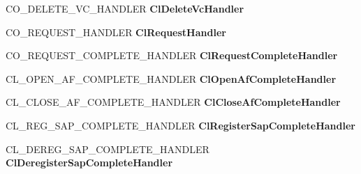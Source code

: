 \begin{DoxyCompactItemize}
C\+O\+\_\+\+D\+E\+L\+E\+T\+E\+\_\+\+V\+C\+\_\+\+H\+A\+N\+D\+L\+ER {\bfseries Cl\+Delete\+Vc\+Handler}
\item 
\mbox{\label{struct___n_d_i_s___c_l_i_e_n_t___c_h_a_r_a_c_t_e_r_i_s_t_i_c_s_aff4246766d4675b8973f46edd56f3506}} 
C\+O\+\_\+\+R\+E\+Q\+U\+E\+S\+T\+\_\+\+H\+A\+N\+D\+L\+ER {\bfseries Cl\+Request\+Handler}
\item 
\mbox{\label{struct___n_d_i_s___c_l_i_e_n_t___c_h_a_r_a_c_t_e_r_i_s_t_i_c_s_a5739dec27e8dec094e7c5deb04f098b0}} 
C\+O\+\_\+\+R\+E\+Q\+U\+E\+S\+T\+\_\+\+C\+O\+M\+P\+L\+E\+T\+E\+\_\+\+H\+A\+N\+D\+L\+ER {\bfseries Cl\+Request\+Complete\+Handler}
\item 
\mbox{\label{struct___n_d_i_s___c_l_i_e_n_t___c_h_a_r_a_c_t_e_r_i_s_t_i_c_s_aa8e406bfe60f8ee8dbfc215ecd3a59db}} 
C\+L\+\_\+\+O\+P\+E\+N\+\_\+\+A\+F\+\_\+\+C\+O\+M\+P\+L\+E\+T\+E\+\_\+\+H\+A\+N\+D\+L\+ER {\bfseries Cl\+Open\+Af\+Complete\+Handler}
\item 
\mbox{\label{struct___n_d_i_s___c_l_i_e_n_t___c_h_a_r_a_c_t_e_r_i_s_t_i_c_s_a4a645ab78f1e0529c9b1ab420d7c0b6b}} 
C\+L\+\_\+\+C\+L\+O\+S\+E\+\_\+\+A\+F\+\_\+\+C\+O\+M\+P\+L\+E\+T\+E\+\_\+\+H\+A\+N\+D\+L\+ER {\bfseries Cl\+Close\+Af\+Complete\+Handler}
\item 
\mbox{\label{struct___n_d_i_s___c_l_i_e_n_t___c_h_a_r_a_c_t_e_r_i_s_t_i_c_s_a2b7c9b69725a36a32bcc1b5789762402}} 
C\+L\+\_\+\+R\+E\+G\+\_\+\+S\+A\+P\+\_\+\+C\+O\+M\+P\+L\+E\+T\+E\+\_\+\+H\+A\+N\+D\+L\+ER {\bfseries Cl\+Register\+Sap\+Complete\+Handler}
\item 
\mbox{\label{struct___n_d_i_s___c_l_i_e_n_t___c_h_a_r_a_c_t_e_r_i_s_t_i_c_s_abfb7e090bb03cbc386df1697ae56cfe5}} 
C\+L\+\_\+\+D\+E\+R\+E\+G\+\_\+\+S\+A\+P\+\_\+\+C\+O\+M\+P\+L\+E\+T\+E\+\_\+\+H\+A\+N\+D\+L\+ER {\bfseries Cl\+Deregister\+Sap\+Complete\+Handler}
\item 
\mbox{\label{struct___n_d_i_s___c_l_i_e_n_t___c_h_a_r_a_c_t_e_r_i_s_t_i_c_s_a41913d1b8528a0451299fdf7f543ace3}} 

\end{DoxyCompactItemize}

